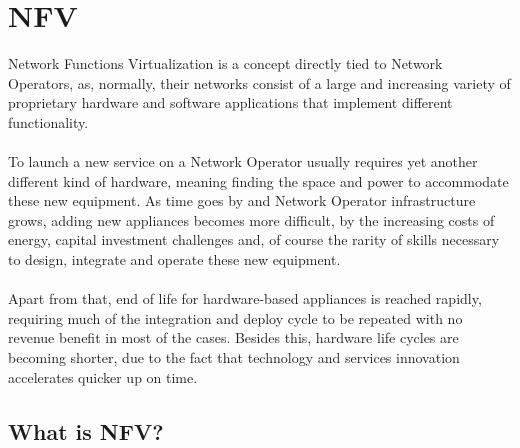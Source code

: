 \documentclass[a4paper, 12pt]{book}
\begin{document}
\section{NFV}
\label{sec:nfv}

Network Functions Virtualization is a concept directly tied to Network Operators, as, normally, their networks consist of a large and increasing variety of proprietary hardware and software applications that implement different functionality.\\
\\
To launch a new service on a Network Operator usually requires yet another different kind of hardware, meaning finding the space and power to accommodate these new equipment. As time goes by and Network Operator infrastructure grows, adding new appliances becomes more difficult, by the increasing costs of energy, capital investment challenges and, of course the rarity of skills necessary to design, integrate and operate these new equipment.\\
\\
Apart from that, end of life for hardware-based appliances is reached rapidly, requiring much of the integration and deploy cycle to be repeated with no revenue benefit in most of the cases. Besides this, hardware life cycles are becoming shorter, due to the fact that technology and services innovation accelerates quicker up on time.

\subsection{What is NFV?}
\end{document}
